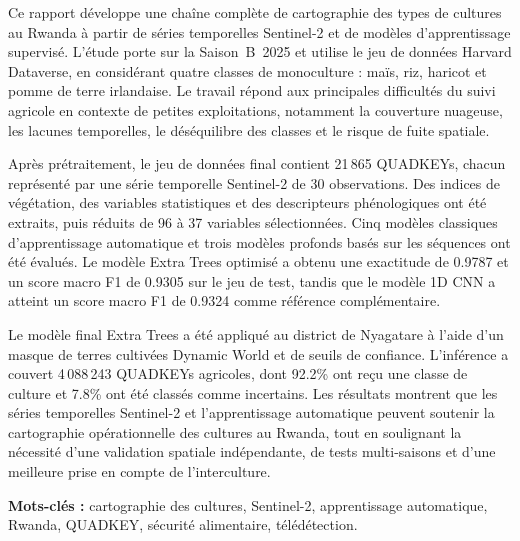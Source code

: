 \noindent
Ce rapport développe une chaîne complète de cartographie des types de cultures
au Rwanda à partir de séries temporelles Sentinel-2 et de modèles
d'apprentissage supervisé. L'étude porte sur la Saison~B~2025 et utilise le
jeu de données Harvard Dataverse, en considérant quatre classes de
monoculture : maïs, riz, haricot et pomme de terre irlandaise. Le travail
répond aux principales difficultés du suivi agricole en contexte de petites
exploitations, notamment la couverture nuageuse, les lacunes temporelles, le
déséquilibre des classes et le risque de fuite spatiale.

Après prétraitement, le jeu de données final contient 21\,865 QUADKEYs,
chacun représenté par une série temporelle Sentinel-2 de 30 observations. Des
indices de végétation, des variables statistiques et des descripteurs
phénologiques ont été extraits, puis réduits de 96 à 37 variables
sélectionnées. Cinq modèles classiques d'apprentissage automatique et trois
modèles profonds basés sur les séquences ont été évalués. Le modèle Extra
Trees optimisé a obtenu une exactitude de 0.9787 et un score macro F1 de
0.9305 sur le jeu de test, tandis que le modèle 1D CNN a atteint un score
macro F1 de 0.9324 comme référence complémentaire.

Le modèle final Extra Trees a été appliqué au district de Nyagatare à l'aide
d'un masque de terres cultivées Dynamic World et de seuils de confiance.
L'inférence a couvert 4\,088\,243 QUADKEYs agricoles, dont 92.2\% ont reçu
une classe de culture et 7.8\% ont été classés comme incertains. Les résultats
montrent que les séries temporelles Sentinel-2 et l'apprentissage automatique
peuvent soutenir la cartographie opérationnelle des cultures au Rwanda, tout
en soulignant la nécessité d'une validation spatiale indépendante, de tests
multi-saisons et d'une meilleure prise en compte de l'interculture.

\medskip
\noindent\textbf{Mots-clés :} cartographie des cultures, Sentinel-2,
apprentissage automatique, Rwanda, QUADKEY, sécurité alimentaire,
télédétection.
